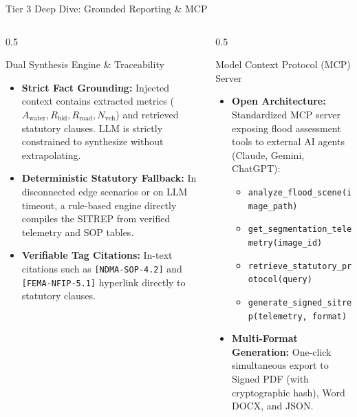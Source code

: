 \documentclass[aspectratio=169, 10pt, professionalfonts]{beamer}
\begin{document}
\begin{frame}{Tier 3 Deep Dive: Grounded Reporting \& MCP}
  \begin{columns}[T]
    \begin{column}{0.5\textwidth}
      \begin{block}{Dual Synthesis Engine \& Traceability}
        \begin{itemize}\setlength{\itemsep}{0.4em}\footnotesize
          \item \textbf{Strict Fact Grounding:} Injected context contains extracted metrics ($A_{\text{water}}, R_{\text{bld}}, R_{\text{road}}, N_{\text{veh}}$) and retrieved statutory clauses. LLM is strictly constrained to synthesize without extrapolating.
          \item \textbf{Deterministic Statutory Fallback:} In disconnected edge scenarios or on LLM timeout, a rule-based engine directly compiles the SITREP from verified telemetry and SOP tables.
          \item \textbf{Verifiable Tag Citations:} In-text citations such as \texttt{[NDMA-SOP-4.2]} and \texttt{[FEMA-NFIP-5.1]} hyperlink directly to statutory clauses.
        \end{itemize}
      \end{block}
    \end{column}
    
    \begin{column}{0.5\textwidth}
      \begin{block}{Model Context Protocol (MCP) Server}
        \begin{itemize}\setlength{\itemsep}{0.4em}\footnotesize
          \item \textbf{Open Architecture:} Standardized MCP server exposing flood assessment tools to external AI agents (Claude, Gemini, ChatGPT):
            \begin{itemize}\scriptsize
              \item \texttt{analyze\_flood\_scene(image\_path)}
              \item \texttt{get\_segmentation\_telemetry(image\_id)}
              \item \texttt{retrieve\_statutory\_protocol(query)}
              \item \texttt{generate\_signed\_sitrep(telemetry, format)}
            \end{itemize}
          \item \textbf{Multi-Format Generation:} One-click simultaneous export to Signed PDF (with cryptographic hash), Word DOCX, and JSON.
        \end{itemize}
      \end{block}
    \end{column}
  \end{columns}
\end{frame}
\end{document}
